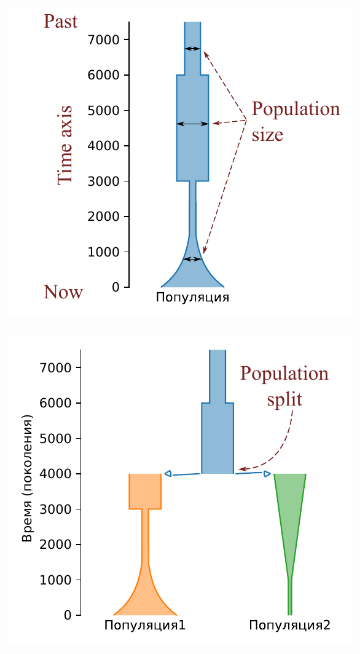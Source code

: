 \begin{figure}[b]
    \centering
    \begin{subfigure}[b]{.33\textwidth}
    \includegraphics[width=\textwidth]{images/part1/dem_history/1d_model_fixed_en.pdf}
    \caption{}
    \end{subfigure}%
    \begin{subfigure}[b]{.33\textwidth}
    \includegraphics[width=\textwidth]{images/part1/dem_history/2d_model_isolation_fixed_en.pdf}

\end{subfigure}
\end{figure}
